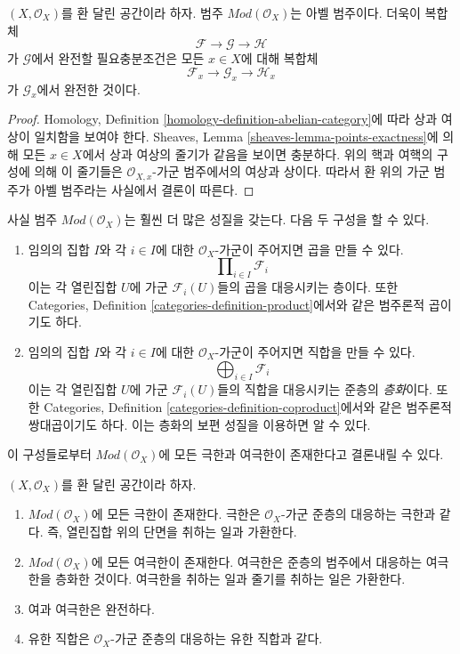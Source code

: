 \begin{lemma}
\label{lemma-abelian}
$(X, \mathcal{O}_X)$를 환 달린 공간이라 하자. 범주
$\textit{Mod}(\mathcal{O}_X)$는 아벨 범주이다. 더욱이 복합체
$$
\mathcal{F} \to \mathcal{G} \to \mathcal{H}
$$
가 $\mathcal{G}$에서 완전할 필요충분조건은 모든 $x \in X$에 대해 복합체
$$
\mathcal{F}_x \to \mathcal{G}_x \to \mathcal{H}_x
$$
가 $\mathcal{G}_x$에서 완전한 것이다.
\end{lemma}

\begin{proof}
Homology, Definition \ref{homology-definition-abelian-category}에 따라
상과 여상이 일치함을 보여야 한다. Sheaves, Lemma
\ref{sheaves-lemma-points-exactness}에 의해 모든 $x \in X$에서 상과 여상의
줄기가 같음을 보이면 충분하다. 위의 핵과 여핵의 구성에 의해 이 줄기들은
$\mathcal{O}_{X, x}$-가군 범주에서의 여상과 상이다. 따라서 환 위의 가군 범주가
아벨 범주라는 사실에서 결론이 따른다.
\end{proof}

\noindent
사실 범주 $\textit{Mod}(\mathcal{O}_X)$는 훨씬 더 많은 성질을 갖는다.
다음 두 구성을 할 수 있다.
\begin{enumerate}
\item 임의의 집합 $I$와 각 $i \in I$에 대한 $\mathcal{O}_X$-가군이 주어지면
곱을 만들 수 있다.
$$
\prod\nolimits_{i \in I} \mathcal{F}_i
$$
이는 각 열린집합 $U$에 가군 $\mathcal{F}_i(U)$들의 곱을 대응시키는 층이다.
또한 Categories, Definition \ref{categories-definition-product}에서와 같은
범주론적 곱이기도 하다.
\item 임의의 집합 $I$와 각 $i \in I$에 대한 $\mathcal{O}_X$-가군이 주어지면
직합을 만들 수 있다.
$$
\bigoplus\nolimits_{i \in I} \mathcal{F}_i
$$
이는 각 열린집합 $U$에 가군 $\mathcal{F}_i(U)$들의 직합을 대응시키는
준층의 {\it 층화}이다. 또한 Categories, Definition
\ref{categories-definition-coproduct}에서와 같은 범주론적 쌍대곱이기도 하다.
이는 층화의 보편 성질을 이용하면 알 수 있다.
\end{enumerate}
이 구성들로부터 $\textit{Mod}(\mathcal{O}_X)$에 모든 극한과 여극한이
존재한다고 결론내릴 수 있다.

\begin{lemma}
\label{lemma-limits-colimits}
$(X, \mathcal{O}_X)$를 환 달린 공간이라 하자.
\begin{enumerate}
\item $\textit{Mod}(\mathcal{O}_X)$에 모든 극한이 존재한다. 극한은
$\mathcal{O}_X$-가군 준층의 대응하는 극한과 같다. 즉, 열린집합 위의 단면을
취하는 일과 가환한다.
\item $\textit{Mod}(\mathcal{O}_X)$에 모든 여극한이 존재한다. 여극한은 준층의
범주에서 대응하는 여극한을 층화한 것이다. 여극한을 취하는 일과 줄기를 취하는
일은 가환한다.
\item 여과 여극한은 완전하다.
\item 유한 직합은 $\mathcal{O}_X$-가군 준층의 대응하는 유한 직합과 같다.
\end{enumerate}
\end{lemma}

